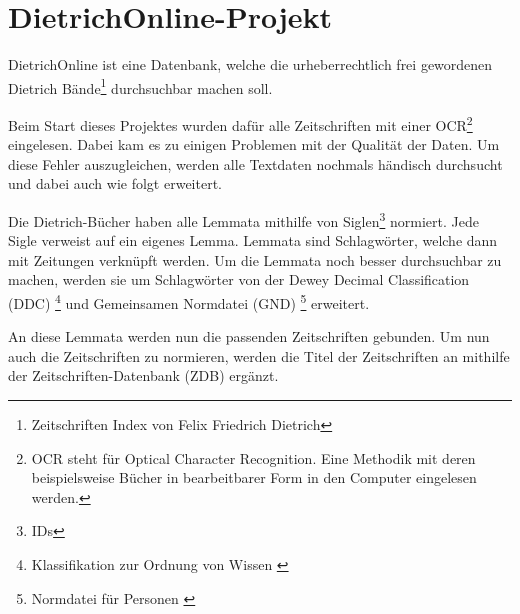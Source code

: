 \chapter{DietrichOnline-Projekt}
\label{dietrichonline}

DietrichOnline ist eine Datenbank, welche die urheberrechtlich frei gewordenen Dietrich Bände\footnote{Zeitschriften Index von Felix Friedrich Dietrich} durchsuchbar machen soll.

Beim Start dieses Projektes wurden dafür alle Zeitschriften mit einer OCR\footnote{OCR steht für Optical Character Recognition. Eine Methodik mit deren beispielsweise Bücher in bearbeitbarer Form in den Computer eingelesen werden.} eingelesen. Dabei kam es zu einigen Problemen mit der Qualität der Daten. Um diese Fehler auszugleichen, werden alle Textdaten nochmals händisch durchsucht und dabei auch wie folgt erweitert.

Die Dietrich-Bücher haben alle Lemmata mithilfe von Siglen\footnote{IDs} normiert. Jede Sigle verweist auf ein eigenes Lemma. Lemmata sind Schlagwörter, welche dann mit Zeitungen verknüpft werden. Um die Lemmata noch besser durchsuchbar zu machen, werden sie um Schlagwörter von der Dewey Decimal Classification (DDC)  \footnote{Klassifikation zur Ordnung von Wissen \cite{DeutscheNationalBibliothek.ddc}} und Gemeinsamen Normdatei (GND)  \footnote{Normdatei für Personen \cite{DeutscheNationalBibliothek.2019b}}
erweitert.

An diese Lemmata werden nun die passenden Zeitschriften gebunden. Um nun auch die Zeitschriften zu normieren, werden die Titel der Zeitschriften an mithilfe der Zeitschriften-Datenbank (ZDB) ergänzt. 
\cite{UniversityofTrier.2016}